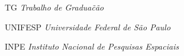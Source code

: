 \begin{siglas}
    \item[TG] \emph{Trabalho de Gradua\~c\~ao}
    \item[UNIFESP] \emph{Universidade Federal de São Paulo}
    \item[INPE] \emph{Instituto Nacional de Pesquisas Espaciais}
\end{siglas}